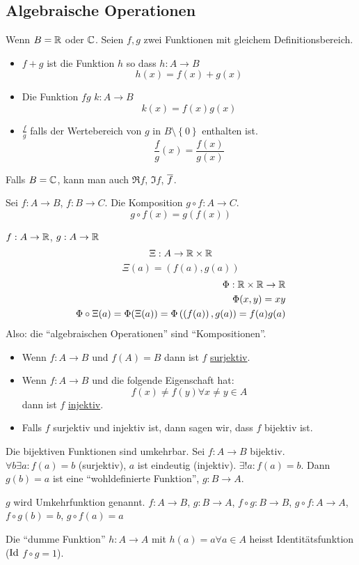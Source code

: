 \subsection{Algebraische Operationen}
Wenn $B=\mathbb{R}$ oder $\mathbb{C}$. Seien $f,g$ zwei Funktionen mit gleichem Definitionsbereich.
\begin{itemize}
  \item $f+g$ ist die Funktion $h$ so dass $h:A\to B$ \[h(x)=f(x) + g(x)\]
  \item Die Funktion $fg$ $k:A\to B$ \[k(x)=f(x)g(x)\]
  \item $\frac{f}{g}$ falls der Wertebereich von $g$ in $B\setminus \left\{ 0 \right\}$ enthalten ist. \[\frac{f}{g}(x)=\frac{f(x)}{g(x)}\]
\end{itemize}
Falls $B=\mathbb{C}$, kann man auch $\Re f$, $\Im f$, $\overline{f}$.
\begin{Def}
  Sei $f:A\to B$, $f:B\to C$. Die Komposition $g\circ f: A\to C$.
  \[g\circ f(x)=g(f(x))\]
\end{Def}
\begin{Bem}
  $f:A\to\mathbb{R}$, $g:A\to \mathbb{R}$ 
  \[\Xi:A\to\mathbb{R}\times\mathbb{R}\]
  \[\Xi(a)=(f(a),g(a))\]
  \begin{align*}
    \Phi:\mathbb{R}\times\mathbb{R}\to\mathbb{R}\\
    \Phi(x,y)=xy\\
    \Phi\circ\Xi(a)=\Phi(\Xi(a))=\Phi\left( \left( f(a) \right),g(a) \right)=f(a)g(a)
  \end{align*}
  Also: die ``algebraischen Operationen'' sind ``Kompositionen''.
\end{Bem}
\begin{Def}
  \begin{itemize}
    \item Wenn $f:A\to B$ und $f(A)=B$ dann ist $f$ \ul{surjektiv}.
    \item Wenn $f:A\to B$ und die folgende Eigenschaft hat:
      \[f(x)\neq f(y)\forall x\neq y\in A\]
      dann ist $f$ \ul{injektiv}.
    \item Falls $f$ surjektiv und injektiv ist, dann sagen wir, dass $f$ bijektiv ist.
  \end{itemize}
\end{Def}
\begin{Bem}
  Die bijektiven Funktionen sind umkehrbar. Sei $f:A\to B$ bijektiv. $\forall b\exists a:f(a)=b$ (surjektiv), $a$ ist eindeutig (injektiv). $\exists! a:f(a)=b$. Dann $g(b)=a$ ist eine ``wohldefinierte Funktion'', $g:B\to A$.
\end{Bem}
\begin{Def}
  $g$ wird Umkehrfunktion genannt. $f:A\to B$, $g:B\to A$, $f\circ g: B\to B$, $g\circ f:A\to A$, $f\circ g(b)=b$, $g\circ f(a)=a$ %
\end{Def}
\begin{Def}
  Die ``dumme Funktion'' $h:A\to A$ mit $h(a)=a\forall a\in A$ heisst Identitätsfunktion ($\operatorname{Id}$ $f\circ g=1$).
\end{Def}

